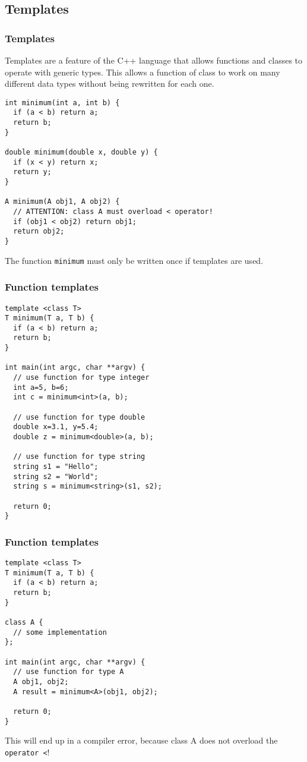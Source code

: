 \subsection{Templates}
\begin{frame}[fragile]
\frametitle{Templates}
Templates are a feature of the C++ language that allows functions and classes to operate
with generic types. This allows a function of class to work on many different data types
without being rewritten for each one.
{\tiny
\begin{lstlisting}
int minimum(int a, int b) {
  if (a < b) return a;
  return b;
}

double minimum(double x, double y) {
  if (x < y) return x;
  return y;
}

A minimum(A obj1, A obj2) {
  // ATTENTION: class A must overload < operator!
  if (obj1 < obj2) return obj1;
  return obj2;
}
\end{lstlisting}
}
The function \verb|minimum| must only be written once if templates are used.
\end{frame}

\begin{frame}[fragile] 
\frametitle{Function templates}
{\tiny
\begin{lstlisting}
template <class T>
T minimum(T a, T b) {
  if (a < b) return a;
  return b;
}

int main(int argc, char **argv) {
  // use function for type integer
  int a=5, b=6;
  int c = minimum<int>(a, b);

  // use function for type double
  double x=3.1, y=5.4;
  double z = minimum<double>(a, b);
  
  // use function for type string
  string s1 = "Hello";
  string s2 = "World";
  string s = minimum<string>(s1, s2);

  return 0;
}
\end{lstlisting}
}
\end{frame}

\begin{frame}[fragile] 
\frametitle{Function templates}
{\tiny
\begin{lstlisting}
template <class T>
T minimum(T a, T b) {
  if (a < b) return a;
  return b;
}

class A {
  // some implementation
};

int main(int argc, char **argv) {
  // use function for type A
  A obj1, obj2;
  A result = minimum<A>(obj1, obj2);
  
  return 0;
}
\end{lstlisting}
}
This will end up in a compiler error, because class A does
not overload the \verb|operator <|!
\end{frame}

